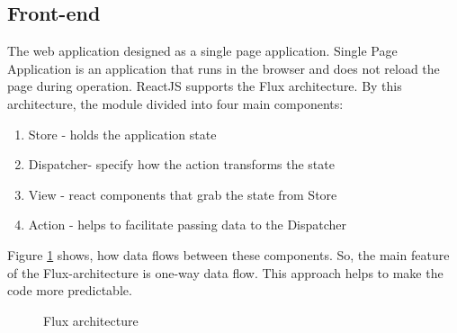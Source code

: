 \documentclass[thesis=B,english]{FITthesis}[2019/03/06]
\begin{document}
\subsection{Front-end} 
The web application designed as a single page application. Single Page Application is an application that runs in the browser and does not reload the page during operation. 
ReactJS supports the Flux architecture. By this architecture, the module divided into four main components:  
\begin{enumerate} 
\item Store - holds the application state
\item Dispatcher-  specify how the action transforms the state
\item View - react components that grab the state from Store
\item  Action -   helps to facilitate passing data to the Dispatcher
\end{enumerate}
Figure \ref{fig:BP_FLUX_ARCHITECTURE} shows, how data flows between these components.
So, the main feature of the Flux-architecture is one-way data flow. This approach helps to make the code more predictable. 
 \begin{figure}[!ht]
\centering 
{}
\caption{Flux architecture}
\label{fig:BP_FLUX_ARCHITECTURE}  
\end{figure}  
\end{document}
